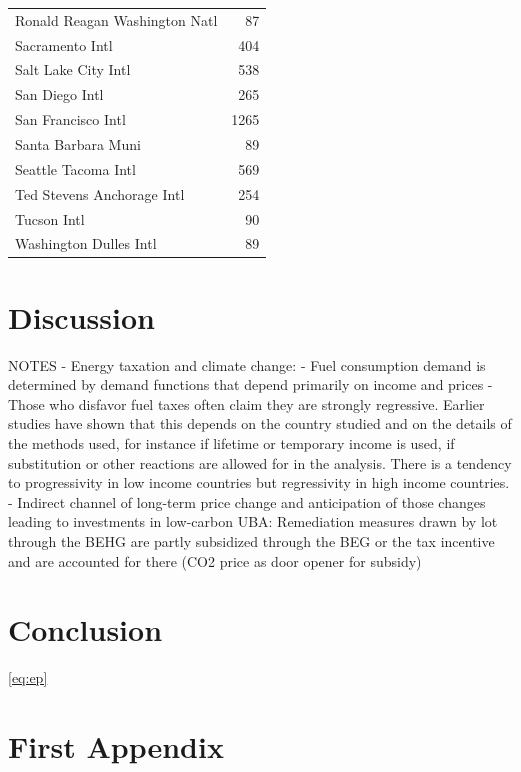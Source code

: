 \documentclass[12pt,twoside]{reedthesis}
\begin{document}
\begin{longtable}[t]{lr}
Ronald Reagan Washington Natl & 87\\
Sacramento Intl & 404\\
\addlinespace
Salt Lake City Intl & 538\\
San Diego Intl & 265\\
San Francisco Intl & 1265\\
Santa Barbara Muni & 89\\
Seattle Tacoma Intl & 569\\
\addlinespace
Ted Stevens Anchorage Intl & 254\\
Tucson Intl & 90\\
Washington Dulles Intl & 89\\*
\end{longtable}
\endgroup{}

\hypertarget{discussion}{%
\chapter{Discussion}\label{discussion}}

NOTES - Energy taxation and climate change:
- Fuel consumption demand is determined by demand functions that depend primarily on income and prices
- Those who disfavor fuel taxes often claim they are strongly regressive. Earlier studies have shown that this depends on the country studied and on the details of the methods used, for instance if lifetime or temporary income is used, if substitution or other reactions are allowed for in the analysis. There is a tendency to progressivity in low income countries but regressivity in high income countries.
- Indirect channel of long-term price change and anticipation of those changes leading to investments in low-carbon UBA: Remediation measures drawn by lot through the BEHG are partly subsidized through the BEG or the tax incentive and are accounted for there (CO2 price as door opener for subsidy)

\hypertarget{conclusion}{%
\chapter{Conclusion}\label{conclusion}}

\eqref{eq:ep}

\appendix

\hypertarget{first-appendix}{%
\chapter{First Appendix}\label{first-appendix}}
\end{document}

